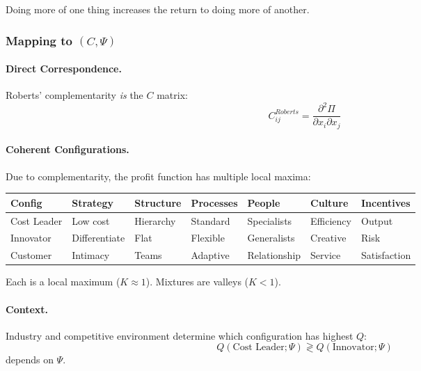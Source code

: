 Doing more of one thing increases the return to doing more of another.

\subsubsection{Mapping to $(C, \Psi)$}

\paragraph{Direct Correspondence.}
Roberts' complementarity \emph{is} the $C$ matrix:
\begin{equation}
  C^{Roberts}_{ij} = \frac{\partial^2 \Pi}{\partial x_i \partial x_j}
\end{equation}

\paragraph{Coherent Configurations.}
Due to complementarity, the profit function has multiple local maxima:

\begin{center}
\renewcommand{\arraystretch}{1.2}
\begin{tabular}{lllllll}
\hline
\textbf{Config} & \textbf{Strategy} & \textbf{Structure} & \textbf{Processes} & \textbf{People} & \textbf{Culture} & \textbf{Incentives} \\
\hline
Cost Leader & Low cost & Hierarchy & Standard & Specialists & Efficiency & Output \\
Innovator & Differentiate & Flat & Flexible & Generalists & Creative & Risk \\
Customer & Intimacy & Teams & Adaptive & Relationship & Service & Satisfaction \\
\hline
\end{tabular}
\end{center}

Each is a local maximum ($K \approx 1$). Mixtures are valleys ($K < 1$).

\paragraph{Context.}
Industry and competitive environment determine which configuration has highest $Q$:
\begin{equation}
  Q(\text{Cost Leader}; \Psi) \gtrless Q(\text{Innovator}; \Psi)
\end{equation}
depends on $\Psi$.


